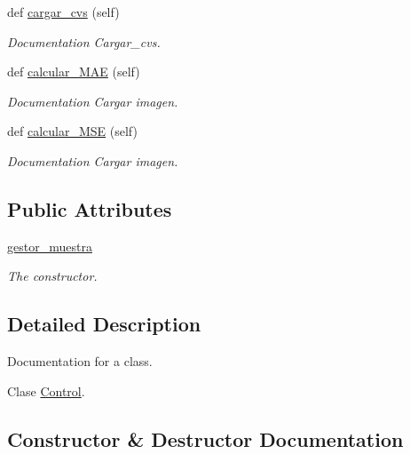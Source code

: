 \begin{DoxyCompactItemize}
def \mbox{\hyperlink{class_control_1_1_control_a22f09f13d6a7128fc4ec24d4dfb52ed5}{cargar\+\_\+cvs}} (self)
\begin{DoxyCompactList}\small\item\em Documentation Cargar\+\_\+cvs. \end{DoxyCompactList}\item 
def \mbox{\hyperlink{class_control_1_1_control_a01b94321309bbd777b1d147559ba8163}{calcular\+\_\+\+M\+AE}} (self)
\begin{DoxyCompactList}\small\item\em Documentation Cargar imagen. \end{DoxyCompactList}\item 
def \mbox{\hyperlink{class_control_1_1_control_ae634564c3406e0fe8fe8cc1e53f8a924}{calcular\+\_\+\+M\+SE}} (self)
\begin{DoxyCompactList}\small\item\em Documentation Cargar imagen. \end{DoxyCompactList}\end{DoxyCompactItemize}
\subsection*{Public Attributes}
\begin{DoxyCompactItemize}
\item 
\mbox{\hyperlink{class_control_1_1_control_a3f36ff12e9a8426c59576f5273feb27f}{gestor\+\_\+muestra}}
\begin{DoxyCompactList}\small\item\em The constructor. \end{DoxyCompactList}\end{DoxyCompactItemize}


\subsection{Detailed Description}
Documentation for a class. 

Clase \mbox{\hyperlink{class_control_1_1_control}{Control}}. 

\subsection{Constructor \& Destructor Documentation}
\mbox{\label{class_control_1_1_control_acbf9737a141c25fda2909c24f68cb75e}} 
